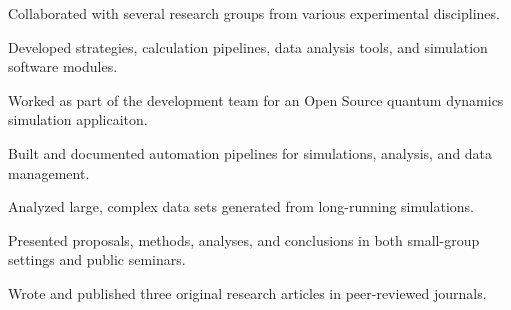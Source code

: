\documentclass[letterpaper]{deedy-resume} %
\begin{document}
\begin{minipage}[t]{0.65\textwidth}
\begin{tightitemize}
\item Collaborated with several research groups from various experimental disciplines. 
\item Developed strategies, calculation pipelines, data analysis tools, and simulation software modules. 
\item Worked as part of the development team for an Open Source quantum dynamics simulation applicaiton. 
\item Built and documented automation pipelines for simulations, analysis, and data management.
\item Analyzed large, complex data sets generated from long-running simulations.
\item Presented proposals, methods, analyses, and conclusions in both small-group settings and public seminars.
\item Wrote and published three original research articles in peer-reviewed journals.
\end{tightitemize}
\sectionspace %



\end{minipage}
\end{document}
